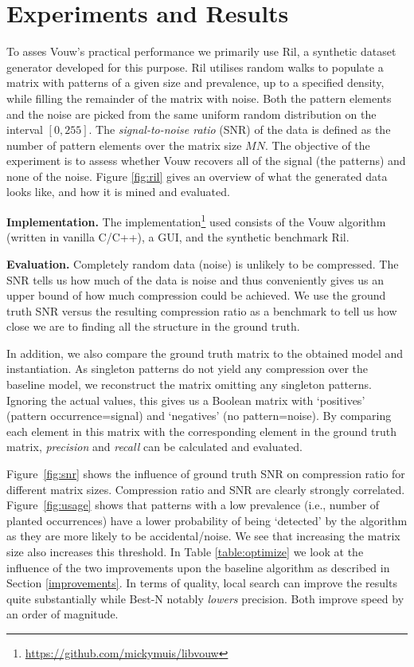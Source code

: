 \documentclass{llncs}
\begin{document}
\section{Experiments and Results}

To asses Vouw's practical performance we primarily use Ril, a synthetic dataset generator developed for this purpose. Ril utilises random walks to populate a matrix with patterns of a given size and prevalence, up to a specified density, while filling the remainder of the matrix with noise. Both the pattern elements and the noise are picked from the same uniform random distribution on the interval $[0,255]$. The \emph{signal-to-noise ratio} (SNR) of the data is defined as the number of pattern elements over the matrix size $MN$. The objective of the experiment is to assess whether Vouw recovers all of the signal (the patterns) and none of the noise. Figure \ref{fig:ril} gives an overview of what the generated data looks like, and how it is mined and evaluated.

\smallskip \noindent \textbf{Implementation.} %
The implementation\footnote{\url{https://github.com/mickymuis/libvouw}} used consists of the Vouw algorithm (written in vanilla C/C++), a GUI, and the synthetic benchmark Ril. 

\smallskip \noindent \textbf{Evaluation.} %
Completely random data (noise) is unlikely to be compressed. The SNR tells us how much of the data is noise and thus conveniently gives us an upper bound of how much compression could be achieved. We use the ground truth SNR versus the resulting compression ratio as a benchmark to tell us how close we are to finding all the structure in the ground truth. 

In addition, we also compare the ground truth matrix to the obtained model and instantiation. As singleton patterns do not yield any compression over the baseline model, we reconstruct the matrix omitting any singleton patterns. Ignoring the actual values, this gives us a Boolean matrix with `positives' (pattern occurrence=signal) and `negatives' (no pattern=noise). By comparing each element in this matrix with the corresponding element in the ground truth matrix, \emph{precision} and \emph{recall} can be calculated and evaluated.

Figure~\ref{fig:snr} shows the influence of ground truth SNR on compression ratio for different matrix sizes. Compression ratio and SNR are clearly strongly correlated. Figure~\ref{fig:usage} shows that patterns with a low prevalence (i.e., number of planted occurrences) have a lower probability of being `detected' by the algorithm as they are more likely to be accidental/noise. We see that increasing the matrix size also increases this threshold. In Table \ref{table:optimize} we look at the influence of the two improvements upon the baseline algorithm as described in Section \ref{improvements}. In terms of quality, local search can improve the results quite substantially while Best-N notably \emph{lowers} precision. Both improve speed by an order of magnitude.%
\end{document}
